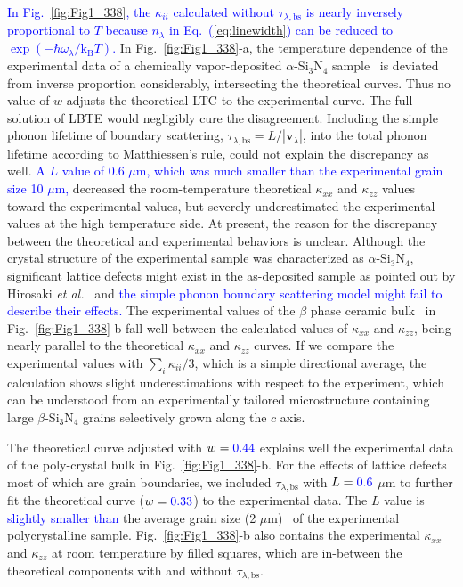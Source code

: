 \documentclass[twocolumn,amsmath,amssymb,a4paper,prb,superscriptaddress,floatfix]{revtex4-1}
\begin{document}
\textcolor {blue}{In Fig.~\ref{fig:Fig1_338}, the $\kappa_{ii}$ calculated without $\tau_{\lambda,\text{bs}}$ 
is nearly inversely proportional to $T$ because $n_\lambda$
in Eq.~(\ref{eq:linewidth}) can be reduced to $\exp(-\hbar\omega_\lambda/\mathrm{k_B}T)$.} In
Fig.~\ref{fig:Fig1_338}-a, the
temperature dependence of the experimental data of a chemically vapor-deposited
$\alpha$-Si$_3$N$_4$ sample~\cite{hirai} is deviated from inverse proportion
considerably, intersecting the theoretical curves. 
Thus no value of $w$ adjusts the theoretical LTC to the
experimental curve.  The full solution of LBTE would negligibly cure the
disagreement.  Including the simple phonon lifetime of boundary scattering,
$\tau_{\lambda,\text{bs}}=L/|\mathbf{v}_\lambda|$, into the total phonon
lifetime according to Matthiessen's rule, could not explain the discrepancy as
well.  \textcolor {blue}{A $L$ value of 0.6 $\mu\text{m}$, which was much
smaller than the experimental grain size 10 $\mu\text{m}$,} decreased the
room-temperature theoretical $\kappa$$_{xx}$ and $\kappa$$_{zz}$ values toward
the experimental values, but severely underestimated the experimental values at
the high temperature side.  At present, the reason for the discrepancy between
the theoretical and experimental behaviors is unclear.  Although the crystal
structure of the experimental sample was characterized as $\alpha$-Si$_3$N$_4$,
significant lattice defects might exist in the as-deposited sample as pointed
out by Hirosaki {\it et al.}~\cite{hirosaki-md} and \textcolor{blue}{the simple
phonon boundary scattering model might fail to describe their effects.} The
experimental values of the $\beta$ phase ceramic bulk~\cite{hirosaki} in
Fig.~\ref{fig:Fig1_338}-b fall well between the calculated values of
$\kappa$$_{xx}$ and  $\kappa$$_{zz}$, being nearly parallel to the theoretical
$\kappa$$_{xx}$ and  $\kappa$$_{zz}$ curves.  If we compare the experimental
values with $\sum_i \kappa_{ii}/3$, which is a simple directional average, the
calculation shows slight underestimations with respect to the experiment, which
can be understood from an experimentally tailored microstructure containing
large $\beta$-Si$_3$N$_4$ grains selectively grown along the $c$
axis.~\cite{hirosaki}

The theoretical curve adjusted with $w=\textcolor{blue}{0.44}$ explains well the experimental
data of the poly-crystal bulk in Fig.~\ref{fig:Fig1_338}-b.  For the effects of
lattice defects most of which are grain boundaries, we included
$\tau_{\lambda,\text{bs}}$ with $L = \textcolor{blue}{0.6}$ $\mu\text{m}$ to further fit the
theoretical curve ($w=\textcolor{blue}{0.33}$) to the experimental data.  The $L$ value is
\textcolor{blue}{slightly smaller than} the average grain size (2 $\mu\text{m}$)~\cite{hirosaki} of the
experimental polycrystalline sample.  Fig.~\ref{fig:Fig1_338}-b also contains
the experimental $\kappa$$_{xx}$ and $\kappa$$_{zz}$ at room temperature by
filled squares, which are in-between the theoretical components with and
without $\tau_{\lambda,\text{bs}}$. 
\end{document}
